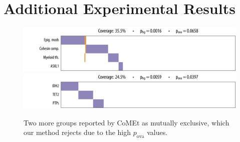 \chapter{Additional Experimental Results}

\begin{figure}[htbp]
\centering
\includegraphics[width=\textwidth]{figures/genes/aml_comet1.pdf}\\[2em]
\includegraphics[width=\textwidth]{figures/genes/aml_comet2.pdf}\\[2em]
\caption{Two more groups reported by CoMEt as mutually exclusive, which our method rejects due to the high $p_{\textrm{ova}}$ values.}
\label{fig:comet_aml}
\end{figure}


